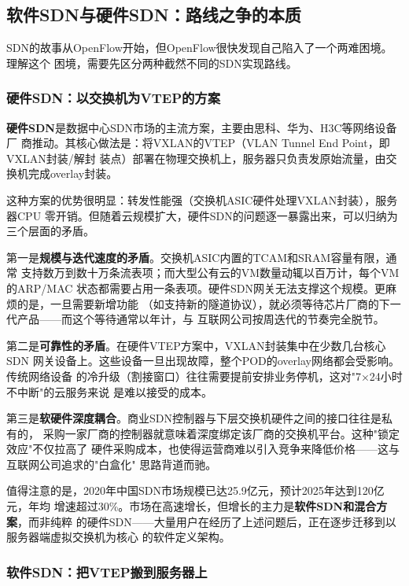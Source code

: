 \subsection{软件SDN与硬件SDN：路线之争的本质}

SDN的故事从OpenFlow开始，但OpenFlow很快发现自己陷入了一个两难困境。理解这个
困境，需要先区分两种截然不同的SDN实现路线。

\subsubsection{硬件SDN：以交换机为VTEP的方案}

\textbf{硬件SDN}是数据中心SDN市场的主流方案，主要由思科、华为、H3C等网络设备厂
商推动。其核心做法是：将VXLAN的VTEP（VLAN Tunnel End Point，即VXLAN封装/解封
装点）部署在物理交换机上，服务器只负责发原始流量，由交换机完成overlay封装。

这种方案的优势很明显：转发性能强（交换机ASIC硬件处理VXLAN封装），服务器CPU
零开销。但随着云规模扩大，硬件SDN的问题逐一暴露出来，可以归纳为三个层面的矛盾。

第一是\textbf{规模与迭代速度的矛盾}。交换机ASIC内置的TCAM和SRAM容量有限，通常
支持数万到数十万条流表项；而大型公有云的VM数量动辄以百万计，每个VM的ARP/MAC
状态都需要占用一条表项。硬件SDN网关无法支撑这个规模。更麻烦的是，一旦需要新增功能
（如支持新的隧道协议），就必须等待芯片厂商的下一代产品——而这个等待通常以年计，与
互联网公司按周迭代的节奏完全脱节。

第二是\textbf{可靠性的矛盾}。在硬件VTEP方案中，VXLAN封装集中在少数几台核心SDN
网关设备上。这些设备一旦出现故障，整个POD的overlay网络都会受影响。传统网络设备
的冷升级（割接窗口）往往需要提前安排业务停机，这对"7×24小时不中断"的云服务来说
是难以接受的成本。

第三是\textbf{软硬件深度耦合}。商业SDN控制器与下层交换机硬件之间的接口往往是私有的，
采购一家厂商的控制器就意味着深度绑定该厂商的交换机平台。这种"锁定效应"不仅拉高了
硬件采购成本，也使得运营商难以引入竞争来降低价格——这与互联网公司追求的"白盒化"
思路背道而驰。

值得注意的是，2020年中国SDN市场规模已达25.9亿元，预计2025年达到120亿元，年均
增速超过30\%。市场在高速增长，但增长的主力是\textbf{软件SDN和混合方案}，而非纯粹
的硬件SDN——大量用户在经历了上述问题后，正在逐步迁移到以服务器端虚拟交换机为核心
的软件定义架构。

\subsubsection{软件SDN：把VTEP搬到服务器上}


